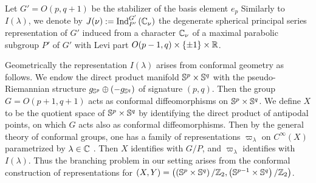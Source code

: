 \documentclass[reqno,12pt]{pja00} %
\newcommand{\assign}{:=}
\newcommand{\tmop}[1]{\ensuremath{\operatorname{#1}}}
\newcommand{\Ind}{\mbox{\normalfont Ind}}
\theoremstyle{definition}
\theoremstyle{exampstyle} \newtheorem{examp}[theorem]{Theorem}
\begin{document}
Let $G'=O(p,q+1)$ be the stabilizer of the basis element $e_p$ Similarly to $I(\lambda)$,
we denote by $J(\nu):=\Ind_{P'}^{G'}\left( \C_\nu \right)$ the degenerate spherical principal series representation of $G'$
induced from a character $\mathbb{C}_\nu$ of a
maximal parabolic
subgroup $P'$ of $G'$ with Levi part $O(p-1,q)\times\left\{ \pm1 \right\}\times\mathbb{R}$.

Geometrically the representation $I (\lambda)$ arises from conformal
geometry as follows. We endow the direct product manifold $\mathbb{S}^p\times\mathbb{S}^q$ with the pseudo-Riemannian structure $g_{\mathbb{S}^p}\oplus\left( -g_{\mathbb{S}^q} \right)$ of signature $(p,q)$.
Then the group $G=O(p+1,q+1)$ acts as conformal diffeomorphisms on $\mathbb{S}^p\times\mathbb{S}^q$. We define $X$ to be the quotient space of $\mathbb{S}^p\times\mathbb{S}^q$ by identifying
the direct product of
antipodal points,
on which $G$ acts also as conformal diffeomorphisms. Then by the general theory of conformal {groups}, one has a family of representations $\varpi_\lambda$ on $C^\infty(X)$
parametrized by $\lambda\in\mathbb{C}$ \cite[Sect.\ 2]{KO1}. Then $X$ identifies with $G/P$, and $\varpi_\lambda$ identifies with $I(\lambda)$. Thus the
branching problem in our setting arises from the
conformal construction of representations for $(X,Y)=\left( \left(\mathbb{S}^p\times\mathbb{S}^q  \right)/\mathbb{Z}_2,\left( \mathbb{S}^{p-1}\times\mathbb{S}^q \right)/\mathbb{Z}_2 \right)$.
\end{document}
